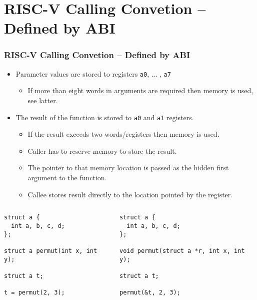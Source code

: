 \documentclass{beamer}
\begin{document}
\section{RISC-V Calling Convetion -- Defined by ABI}

\begin{frame}[fragile]
\frametitle{RISC-V Calling Convetion -- Defined by ABI}

\begin{itemize}
 \item Parameter values are stored to registers \texttt{a0}, ... , \texttt{a7}
\begin{itemize}
 \item If more than eight words in arguments are required then memory is used, see latter.
\end{itemize}
 \item The result of the function is stored to \texttt{a0} and \texttt{a1} registers.
\begin{itemize}
 \item If the result exceeds two words/registers then memory is used.
 \item Caller has to reserve memory to store the result.
 \item The pointer to that memory location is passed as the hidden first argument to the function.
 \item Callee stores result directly to the location pointed by the register.
\end{itemize}
\end{itemize}

\begin{columns}
\begin{column}{0.45\textwidth}  
\begin{verbatim}
struct a {
  int a, b, c, d;
};

struct a permut(int x, int y);

struct a t;

t = permut(2, 3);
\end{verbatim}
\end{column}
\begin{column}{0.55\textwidth}  
\begin{verbatim}
struct a {
  int a, b, c, d;
};

void permut(struct a *r, int x, int y);

struct a t;

permut(&t, 2, 3);
\end{verbatim}
\end{column}
\end{columns}
\end{frame}
\end{document}
